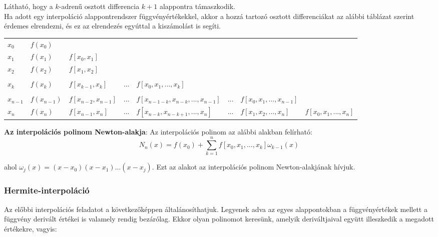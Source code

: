 \documentclass[margin=0px]{article}
\begin{document}
	\noindent Látható, hogy a $k$-adrenű osztott differencia $k+1$ alappontra támaszkodik.\\
	
	Ha adott egy interpoláció alappontrendszer függvényértékekkel, akkor a hozzá tartozó osztott differenciákat az
	alábbi táblázat szerint érdemes elrendezni, és ez az elrendezés egyúttal a kiszámolást is segíti.
	
	\begin{table}[H]
		\begin{tabular}{llllllll}
			$x_{0}$ & $f(x_{0})$ &  &  &  &  & & \\ 
			$x_{1}$ & $f(x_{1})$ & $f[x_{0},x_{1}]$ &  &  &  & & \\
			$x_{2}$ & $f(x_{2})$ & $f[x_{1},x_{2}]$ &  &  &  &  &\\
			\rotatebox[origin=c]{90}{...} & \rotatebox[origin=c]{90}{...}&  &  &  &  &  &\\
			$x_{k}$& $f(x_{k})$ & $f[x_{k-1},x_{k}]$ & ... &  $f[x_{0}, x_{1}, ..., x_{k}]$ &  & & \\
			\rotatebox[origin=c]{90}{...} &\rotatebox[origin=c]{90}{...}  &  & &  &  & & \\
			$x_{n-1}$ & $f(x_{n-1})$ & $f[x_{n-2},x_{n-1}]$  & ... &  $f[x_{n-1-k}, x_{n-k}, ..., x_{n-1}]$& ... &
			$f[x_{0}, x_{1}, ..., x_{n-1}]$ &\\
			$x_{n} $& $f(x_{n})$ & $f[x_{n-1},x_{n}]$ & ... &  $f[x_{n-k}, x_{n-k+1}, ..., x_{n}]$ & ... &
			$f[x_{1}, x_{2}, ..., x_{n}]$ & $f[x_{0}, x_{1}, ..., x_{n}]$\\
		\end{tabular}
	\end{table}
	
	
	\noindent \textbf{Az interpolációs polinom Newton-alakja}: Az interpolációs polinom az alábbi alakban felírható:
	\begin{displaymath}
		N_{n}(x) = f(x_{0}) + \displaystyle\sum_{k=1}^{n}f[x_{0},x_{1}, ..., x_{k}] \omega_{k-1}(x)
	\end{displaymath}
	
	\noindent ahol $\omega_{j}(x) =  (x-x_{0})(x-x_{1})...(x-x_{j})$. Ezt az alakot az interpolációs polinom Newton-alakjának hívjuk.
	
	\subsubsection{Hermite-interpoláció}
	Az előbbi interpolációs feladatot a következőképpen általánosíthatjuk. Legyenek adva az egyes alappontokban a függvényértékek
	mellett a függvény derivált értékei is valamely rendig bezárólag. Ekkor olyan polinomot keresünk, amelyik deriváltjaival együtt
	illeszkedik a megadott értékekre, vagyis:\\
	
\end{document}
